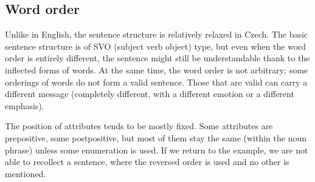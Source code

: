 \subsection{Word order}
Unlike in English, the sentence structure is relatively relaxed in Czech. The basic sentence structure is of SVO (subject verb object) type, but even when the word order is entirely different, the sentence might still be understandable thank to the inflected forms of words. At the same time, the word order is not arbitrary; some orderings of words do not form a valid sentence. Those that are valid can carry a different message (completely different, with a different emotion or a different emphasis).

The position of attributes tends to be mostly fixed. Some attributes are prepositive, some postpositive, but most of them stay the same (within the noun phrase) unless some enumeration is used. If we return to the  example, we are not able to recollect a sentence, where the reversed order is used and no other  is mentioned.


